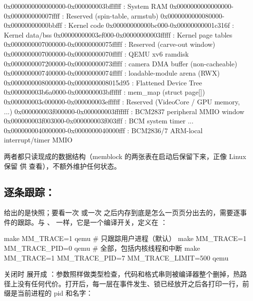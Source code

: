 \begin{txtcode}
0x0000000000000000-0x000000003bffffff : System RAM
  0x0000000000000000-0x000000000007ffff : Reserved (spin-table, armstub)
  0x0000000000080000-0x00000000000bbfff : Kernel code
  0x00000000000bc000-0x00000000001c316f : Kernel data/bss
  0x00000000003ef000-0x00000000003fffff : Kernel page tables
  0x0000000007000000-0x00000000075fffff : Reserved (carve-out window)
    0x0000000007000000-0x00000000070fffff : QEMU xv6 ramdisk
    0x0000000007200000-0x00000000073fffff : camera DMA buffer (non-cacheable)
    0x0000000007400000-0x00000000074fffff : loadable-module arena (RWX)
  0x0000000008000000-0x0000000008015d95 : Flattened Device Tree
  0x000000003b6a0000-0x000000003bffffff : mem_map (struct page[])
0x000000003c000000-0x000000003effffff : Reserved (VideoCore / GPU memory, ...)
0x000000003f000000-0x000000003fffffff : BCM2837 peripheral MMIO window
  0x000000003f003000-0x000000003f003fff : BCM system timer
  ...
0x0000000040000000-0x0000000040000fff : BCM2836/7 ARM-local interrupt/timer MMIO
\end{txtcode}

两者都只读现成的数据结构（memblock 的两张表在启动后保留下来，正像 Linux 保留  供  查看），不额外维护任何状态。

\subsection{逐条跟踪：}

 给出的是快照；要看一次  或一次  之后内存到底是怎么一页页分出去的，需要逐事件的跟踪。与 、 一样，它是一个编译开关，定义在 ：

\begin{shcode}
make MM_TRACE=1 qemu                      # 只跟踪用户进程（默认）
make MM_TRACE=1 MM_TRACE_PID=0 qemu       # 全部，包括内核线程和中断
make MM_TRACE=1 MM_TRACE_PID=7 MM_TRACE_LIMIT=500 qemu
\end{shcode}

关闭时  展开成 ：参数照样做类型检查，代码和格式串则被编译器整个删掉，热路径上没有任何代价。打开后，每一层在事件发生、锁已经放开之后各打印一行，前缀是当前进程的 pid 和名字：

